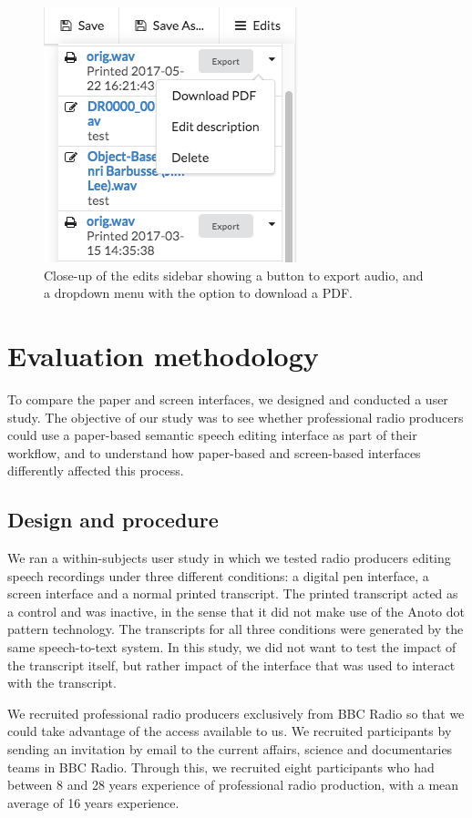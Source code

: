 \begin{figure}[p]
  \centering
  \includegraphics[width=0.4\columnwidth]{figs/discourse-download-pdf.png}
  \caption{Close-up of the edits sidebar showing a button to export audio, and a dropdown menu with the option to
  download a PDF.}
  \label{fig:download-pdf}
\end{figure}

\section{Evaluation methodology}\label{sec:paper-method}

To compare the paper and screen interfaces, we designed and conducted a user study.  The objective of our study was to
see whether professional radio producers could use a paper-based semantic speech editing interface as part of their
workflow, and to understand how paper-based and screen-based interfaces differently affected this process.

\subsection{Design and procedure}
We ran a within-subjects user study in which we tested radio producers editing speech recordings under three different
conditions: a digital pen interface, a screen interface and a normal printed transcript. The printed transcript acted
as a control and was inactive, in the sense that it did not make use of the Anoto dot pattern technology.  The
transcripts for all three conditions were generated by the same speech-to-text system. In this study, we did not want
to test the impact of the transcript itself, but rather impact of the interface that was used to interact with the
transcript.

We recruited professional radio producers exclusively from BBC Radio so that we could take advantage of the access 
available to us. We recruited participants by sending an invitation by email to the current affairs, science and
documentaries teams in BBC Radio.  Through this, we recruited eight participants who had between 8 and 28 years
experience of professional radio production, with a mean average of 16 years experience.

